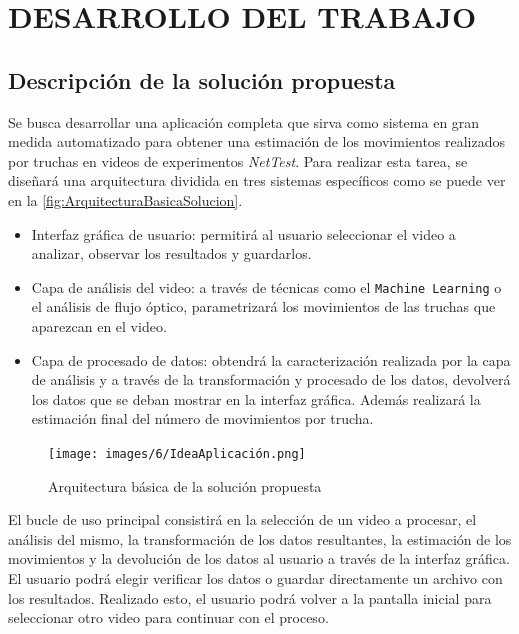 \section{DESARROLLO DEL TRABAJO}

\subsection{Descripción de la solución propuesta}

Se busca desarrollar una aplicación completa que sirva como sistema en gran medida automatizado para obtener una estimación 
de los movimientos realizados por truchas en videos de experimentos \textit{NetTest}. Para realizar esta tarea, se diseñará 
una arquitectura dividida en tres sistemas específicos como se puede ver en la \autoref{fig:ArquitecturaBasicaSolucion}.

\begin{itemize}
    \item Interfaz gráfica de usuario: permitirá al usuario seleccionar el video a analizar, observar los resultados y guardarlos.
    \item Capa de análisis del video: a través de técnicas como el \texttt{Machine Learning} o el análisis de flujo óptico, parametrizará 
    los movimientos de las truchas que aparezcan en el video.
    \item Capa de procesado de datos: obtendrá la caracterización realizada por la capa de análisis y a través de la transformación y 
    procesado de los datos, devolverá los datos que se deban mostrar en la interfaz gráfica. Además realizará la estimación final del número 
    de movimientos por trucha.
\end{itemize}
\begin{figure}[H]
    \centering
    \texttt{[image: images/6/IdeaAplicación.png]}
    \caption{Arquitectura básica de la solución propuesta}
    \label{fig:ArquitecturaBasicaSolucion}
\end{figure}

El bucle de uso principal consistirá en la selección de un video a procesar, el análisis del mismo, la transformación de los datos resultantes, 
la estimación de los movimientos y la devolución de los datos al usuario a través de la interfaz gráfica.\newline
El usuario podrá elegir verificar los datos o guardar directamente un archivo con los resultados. Realizado esto, el usuario podrá volver a la 
pantalla inicial para seleccionar otro video para continuar con el proceso.

